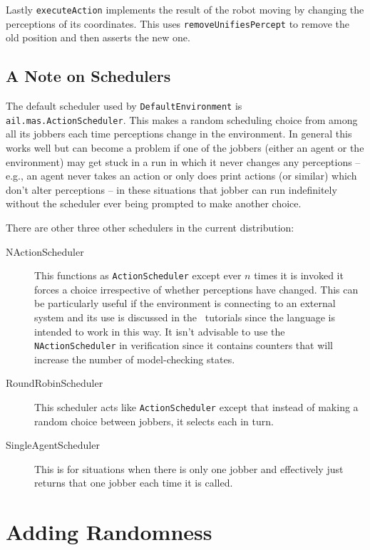 \documentclass[a4]{article}
\begin{document}
Lastly \texttt{executeAction} implements the result of the robot moving by changing the perceptions of its coordinates.  This uses \texttt{removeUnifiesPercept} to remove the old position and then asserts the new one.

\subsection{A Note on Schedulers}

The default scheduler used by \texttt{DefaultEnvironment} is \texttt{ail.mas.ActionScheduler}.  This makes a random scheduling choice from among all its jobbers each time perceptions change in the environment.  In general this works well but can become a problem if one of the jobbers (either an agent or the environment) may get stuck in a run in which it never changes any perceptions -- e.g., an agent never takes an action or only does print actions (or similar) which don't alter perceptions -- in these situations that jobber can run indefinitely without the scheduler ever being prompted to make another choice.

There are other three other schedulers in the current distribution:

\begin{description}
\item[NActionScheduler] This functions as \texttt{ActionScheduler} except ever $n$ times it is invoked it forces a choice irrespective of whether perceptions have changed.  This can be particularly useful if the environment is connecting to an external system and its use is discussed in the \eass\ tutorials since the language is intended to work in this way.  It isn't advisable to use the \texttt{NActionScheduler} in verification since it contains counters that will increase the number of model-checking states.
\item[RoundRobinScheduler]  This scheduler acts like \texttt{ActionScheduler} except that instead of making a random choice between jobbers, it selects each in turn.
\item[SingleAgentScheduler] This is for situations when there is only one jobber and effectively just returns that one jobber each time it is called.
\end{description}

\section{Adding Randomness}
\end{document}
